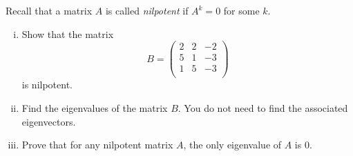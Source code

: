 \begin{question}\normalfont

Recall that a matrix $A$ is called \emph{nilpotent} if $A^k=0$ for some $k$. 

\begin{enumerate}[(i)]
\item Show that the matrix 
\[
B =\begin{pmatrix}
			2 & 2 & -2\\
			5 & 1 & -3\\
			1 & 5 & -3 \\
		\end{pmatrix}
\]
is nilpotent.

\item Find the eigenvalues of the matrix $B$. You do not need to find the associated eigenvectors. 

\item Prove that for any nilpotent matrix $A$, the only eigenvalue of $A$ is 0. 
\end{enumerate}
	
	\end{question}

